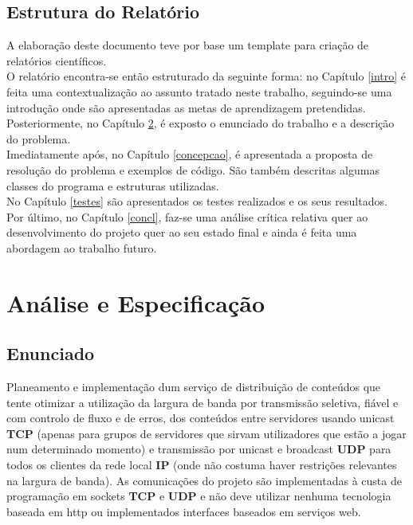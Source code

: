 \documentclass{report}
\begin{document}

\section{Estrutura do Relatório} \label{estrutura}
A elaboração deste documento teve por base um template para criação de relatórios científicos. \\
O relatório encontra-se então estruturado da seguinte forma: no Capítulo \ref{intro} é feita uma contextualização ao assunto tratado neste trabalho, seguindo-se uma introdução onde são apresentadas as metas de aprendizagem pretendidas.\\
Posteriormente, no Capítulo \ref{ae}, é exposto o enunciado do trabalho e a descrição do problema.\\
Imediatamente após, no Capítulo \ref{concepcao}, é apresentada a proposta de resolução do problema e exemplos de código. São também descritas algumas classes do programa e estruturas utilizadas.\\
No Capítulo \ref{testes} são apresentados os testes realizados e os seus resultados.\\
Por último, no Capítulo \ref{concl}, faz-se uma análise crítica relativa quer ao desenvolvimento do projeto quer ao seu estado final e ainda é feita uma abordagem ao trabalho futuro.

\chapter{Análise e Especificação} \label{ae}
\section{Enunciado}\label{enunciado}
Planeamento e implementação dum serviço de distribuição de conteúdos que tente otimizar a utilização da largura de banda por transmissão seletiva, fiável e com controlo de fluxo e de erros, dos conteúdos entre servidores usando unicast \textbf{TCP} (apenas para grupos de servidores que sirvam utilizadores que estão a jogar num determinado momento) e transmissão por unicast e broadcast \textbf{UDP} para todos os clientes da rede local \textbf{IP} (onde não costuma haver restrições relevantes na largura de banda). As comunicações do projeto são implementadas à custa de programação em sockets \textbf{TCP} e \textbf{UDP} e não deve utilizar nenhuma tecnologia baseada em http ou implementados interfaces baseados em serviços web.
\end{document}
